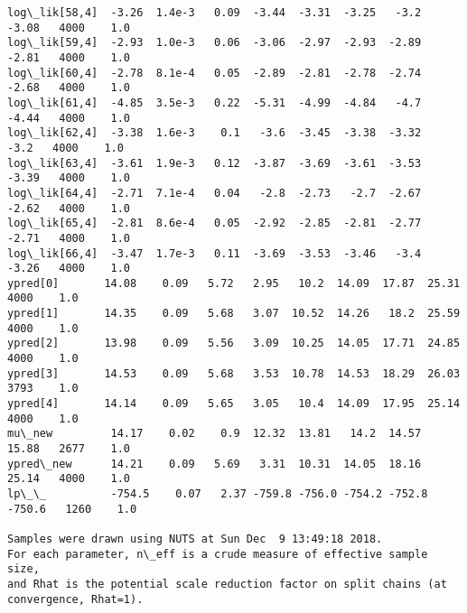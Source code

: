 \documentclass[11pt]{article}
\begin{document}
\begin{Verbatim}[commandchars=\\\{\}]
log\_lik[58,4]  -3.26  1.4e-3   0.09  -3.44  -3.31  -3.25   -3.2  -3.08   4000    1.0
log\_lik[59,4]  -2.93  1.0e-3   0.06  -3.06  -2.97  -2.93  -2.89  -2.81   4000    1.0
log\_lik[60,4]  -2.78  8.1e-4   0.05  -2.89  -2.81  -2.78  -2.74  -2.68   4000    1.0
log\_lik[61,4]  -4.85  3.5e-3   0.22  -5.31  -4.99  -4.84   -4.7  -4.44   4000    1.0
log\_lik[62,4]  -3.38  1.6e-3    0.1   -3.6  -3.45  -3.38  -3.32   -3.2   4000    1.0
log\_lik[63,4]  -3.61  1.9e-3   0.12  -3.87  -3.69  -3.61  -3.53  -3.39   4000    1.0
log\_lik[64,4]  -2.71  7.1e-4   0.04   -2.8  -2.73   -2.7  -2.67  -2.62   4000    1.0
log\_lik[65,4]  -2.81  8.6e-4   0.05  -2.92  -2.85  -2.81  -2.77  -2.71   4000    1.0
log\_lik[66,4]  -3.47  1.7e-3   0.11  -3.69  -3.53  -3.46   -3.4  -3.26   4000    1.0
ypred[0]       14.08    0.09   5.72   2.95   10.2  14.09  17.87  25.31   4000    1.0
ypred[1]       14.35    0.09   5.68   3.07  10.52  14.26   18.2  25.59   4000    1.0
ypred[2]       13.98    0.09   5.56   3.09  10.25  14.05  17.71  24.85   4000    1.0
ypred[3]       14.53    0.09   5.68   3.53  10.78  14.53  18.29  26.03   3793    1.0
ypred[4]       14.14    0.09   5.65   3.05   10.4  14.09  17.95  25.14   4000    1.0
mu\_new         14.17    0.02    0.9  12.32  13.81   14.2  14.57  15.88   2677    1.0
ypred\_new      14.21    0.09   5.69   3.31  10.31  14.05  18.16  25.14   4000    1.0
lp\_\_          -754.5    0.07   2.37 -759.8 -756.0 -754.2 -752.8 -750.6   1260    1.0

Samples were drawn using NUTS at Sun Dec  9 13:49:18 2018.
For each parameter, n\_eff is a crude measure of effective sample size,
and Rhat is the potential scale reduction factor on split chains (at 
convergence, Rhat=1).


    \end{Verbatim}


    
    
    
    
\end{document}
